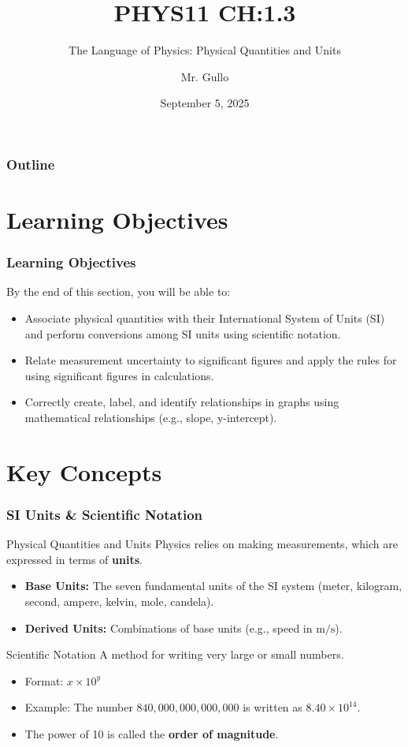 \documentclass{beamer}
\title[CH 1.3]{PHYS11 CH:1.3}
\subtitle{The Language of Physics: Physical Quantities and Units}
\author[Mr. Gullo]{Mr. Gullo}
\date[Sept 2025]{September 5, 2025}
\begin{document}
\begin{frame}
    \titlepage
    \centering
\end{frame}

\begin{frame}
    \frametitle{Outline}
    \tableofcontents
\end{frame}

\section{Learning Objectives}
\begin{frame}
    \frametitle{Learning Objectives}
    By the end of this section, you will be able to:
    \begin{itemize}
        \item Associate physical quantities with their International System of Units (SI) and perform conversions among SI units using scientific notation.
        \item Relate measurement uncertainty to significant figures and apply the rules for using significant figures in calculations.
        \item Correctly create, label, and identify relationships in graphs using mathematical relationships (e.g., slope, y-intercept).
    \end{itemize}
\end{frame}

\section{Key Concepts}
\begin{frame}
    \frametitle{SI Units \& Scientific Notation}
    \begin{block}{Physical Quantities and Units}
        Physics relies on making measurements, which are expressed in terms of \textbf{units}.
        \begin{itemize}
            \item \textbf{Base Units:} The seven fundamental units of the SI system (meter, kilogram, second, ampere, kelvin, mole, candela).
            \item \textbf{Derived Units:} Combinations of base units (e.g., speed in \(\text{m/s}\)).
        \end{itemize}
    \end{block}
    \begin{block}{Scientific Notation}
        A method for writing very large or small numbers.
        \begin{itemize}
            \item Format: \(x \times 10^y\)
            \item Example: The number \(840,000,000,000,000\) is written as \(8.40 \times 10^{14}\).
            \item The power of 10 is called the \textbf{order of magnitude}.
        \end{itemize}
    \end{block}
\end{frame}
\end{document}
